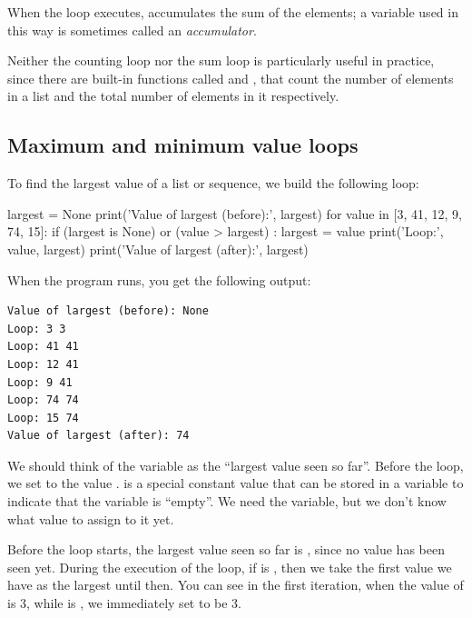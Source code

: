 When the loop executes,  accumulates the sum of the elements; a variable used in this way is sometimes called an \emph{accumulator}.


Neither the counting loop nor the sum loop is particularly useful in practice, since there are built-in functions called  and , that count the number of elements in a list and the total number of elements in it respectively.

\hypertarget{bucles-de-muxe1ximos-y-muxednimos}{%
\subsection{Maximum and minimum value loops}\label{bucles-de-muxe1ximos-y-muxednimos}}

  

To find the largest value of a list or sequence, we build the following loop:

\begin{python}[frame=single]
largest = None
print('Value of largest (before):', largest)
for value in [3, 41, 12, 9, 74, 15]:
    if (largest is None) or (value > largest) :
        largest = value
    print('Loop:', value, largest)
print('Value of largest (after):', largest)
\end{python}

When the program runs, you get the following output:

\begin{Verbatim}[frame=single]
Value of largest (before): None
Loop: 3 3
Loop: 41 41
Loop: 12 41
Loop: 9 41
Loop: 74 74
Loop: 15 74
Value of largest (after): 74
\end{Verbatim}

We should think of the variable  as the ``largest value seen so far''. Before the loop, we set  to the value .  is a special constant value that can be stored in a variable to indicate that the variable is ``empty''. We need the variable, but we don't know what value to assign to it yet.

Before the loop starts, the largest value seen so far is , since no value has been seen yet. During the execution of the loop, if  is , then we take the first value we have as the largest until then. You can see in the first iteration, when the value of  is 3, while  is , we immediately set  to be 3.

